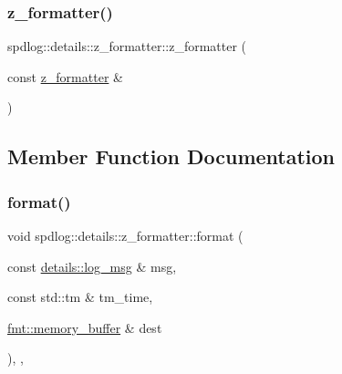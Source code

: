 \mbox{\label{classspdlog_1_1details_1_1z__formatter_a09f0b7e5cf2bc8260375d38ac9b14a31}} 
\subsubsection{\texorpdfstring{z\+\_\+formatter()}{z\_formatter()}\hspace{0.1cm}{\footnotesize\ttfamily [3/3]}}
{\footnotesize\ttfamily spdlog\+::details\+::z\+\_\+formatter\+::z\+\_\+formatter (\begin{DoxyParamCaption}\item[{const \hyperlink{classspdlog_1_1details_1_1z__formatter}{z\+\_\+formatter} \&}]{ }\end{DoxyParamCaption})\hspace{0.3cm}{\ttfamily [delete]}}



\subsection{Member Function Documentation}
\mbox{\label{classspdlog_1_1details_1_1z__formatter_ada7a5e9a3c30039cbfb684b7743b8945}} 
\subsubsection{\texorpdfstring{format()}{format()}}
{\footnotesize\ttfamily void spdlog\+::details\+::z\+\_\+formatter\+::format (\begin{DoxyParamCaption}\item[{const \hyperlink{structspdlog_1_1details_1_1log__msg}{details\+::log\+\_\+msg} \&}]{msg,  }\item[{const std\+::tm \&}]{tm\+\_\+time,  }\item[{\hyperlink{format_8h_a21cbf729f69302f578e6db21c5e9e0d2}{fmt\+::memory\+\_\+buffer} \&}]{dest }\end{DoxyParamCaption})\hspace{0.3cm}{\ttfamily [inline]}, {\ttfamily [override]}, {\ttfamily [virtual]}}



